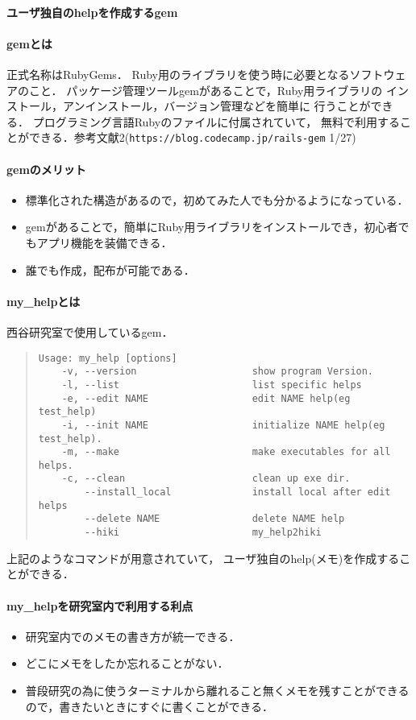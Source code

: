 \paragraph{ユーザ独自のhelpを作成するgem}
\paragraph{gemとは}
正式名称はRubyGems．
Ruby用のライブラリを使う時に必要となるソフトウェアのこと．
パッケージ管理ツールgemがあることで，Ruby用ライブラリの
インストール，アンインストール，バージョン管理などを簡単に
行うことができる．
プログラミング言語Rubyのファイルに付属されていて，
無料で利用することができる．参考文献2(\verb|https://blog.codecamp.jp/rails-gem| 1/27)

\paragraph{gemのメリット}
\begin{itemize}
\item 標準化された構造があるので，初めてみた人でも分かるようになっている．
\item gemがあることで，簡単にRuby用ライブラリをインストールでき，初心者でもアプリ機能を装備できる．
\item 誰でも作成，配布が可能である．
\end{itemize}
\paragraph{my\_helpとは}
西谷研究室で使用しているgem．
\begin{quote}\begin{verbatim}
Usage: my_help [options]
    -v, --version                    show program Version.
    -l, --list                       list specific helps
    -e, --edit NAME                  edit NAME help(eg test_help)
    -i, --init NAME                  initialize NAME help(eg test_help).
    -m, --make                       make executables for all helps.
    -c, --clean                      clean up exe dir.
        --install_local              install local after edit helps
        --delete NAME                delete NAME help
        --hiki                       my_help2hiki
\end{verbatim}\end{quote}
上記のようなコマンドが用意されていて，
ユーザ独自のhelp(メモ)を作成することができる．

\paragraph{my\_helpを研究室内で利用する利点}
\begin{itemize}
\item 研究室内でのメモの書き方が統一できる．
\item どこにメモをしたか忘れることがない．
\item 普段研究の為に使うターミナルから離れること無くメモを残すことができるので，書きたいときにすぐに書くことができる．
\end{itemize}
